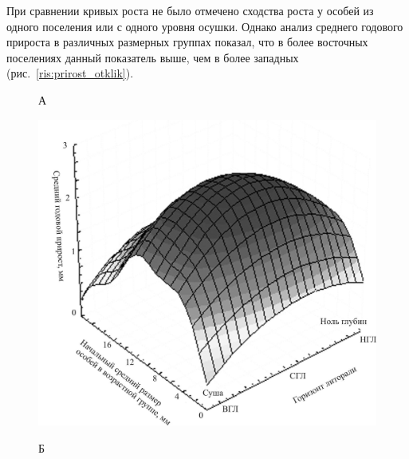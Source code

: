 {{При сравнении кривых роста не было отмечено сходства роста у особей из одного поселения или с одного уровня осушки. 
Однако анализ среднего годового прироста в различных размерных группах показал, что в более восточных поселениях данный показатель выше, чем в более западных (рис.~\ref{ris:prirost_otklik}). 
	\begin{figure}[]
		\begin{minipage}[b]{.5\linewidth}
				{\small А}
			\begin{center}
				\includegraphics[width=\textwidth]{../Barenc_Sea/growth_from_MSc/prirost_otklik_mareography.jpg}
			\end{center}
		\end{minipage}
	\hfil %
		\begin{minipage}[b]{.5\linewidth}
				{\small Б}
			\begin{center}

\end{center}
\end{minipage}
\end{figure}}}
